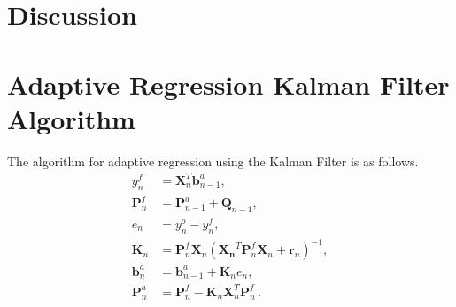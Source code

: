 \documentclass[10pt]{article}
\newcommand{\bt}[1]{\mathbf{#1}}
\begin{document}
\section{Discussion}



\appendix 
\section{Adaptive Regression Kalman Filter Algorithm}

The algorithm for adaptive regression using the Kalman Filter is as follows.
\begin{align*}
y_n^f &= \bt{X}_n^T \bt{b}_{n-1}^a, \\
\bt{P}_n^f &= \bt{P}_{n-1}^a + \bt{Q}_{n-1}, \\
e_n &= y_n^o - y_n^f, \\
\bt{K}_n &=  \bt{P}_n^f \bt{X}_n (\bt{X_n}^T \bt{P}_n^f \bt{X}_n + \bt{r}_n )^{-1}, \\
\bt{b}_n^a &= \bt{b}_{n-1}^a + \bt{K}_n e_n, \\
\bt{P}_n^a &= \bt{P}_n^f - \bt{K}_n \bt{X}_n^T \bt{P}_n^f\,.
\end{align*}
\end{document}
